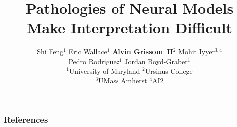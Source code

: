 \documentclass{beamer}
\title[EMNLP]{Pathologies of Neural Models Make Interpretation Difficult}
\author{
\small{
Shi Feng$^1$ Eric Wallace$^1$ \textbf{Alvin Grissom~II}$^2$ Mohit Iyyer$^{3,4}$ \\
Pedro Rodriguez$^1$ Jordan Boyd-Graber$^1$
} \\\vspace{10px}
\footnotesize{$^1$University of Maryland $^2$Ursinus College\\ $^3$UMass Amherst $^4$AI2}
}
\begin{document}
\begin{frame}
    \titlepage
\end{frame}










\begin{frame}[t, allowframebreaks]
\frametitle{References}

\small

\end{frame}
\end{document}
